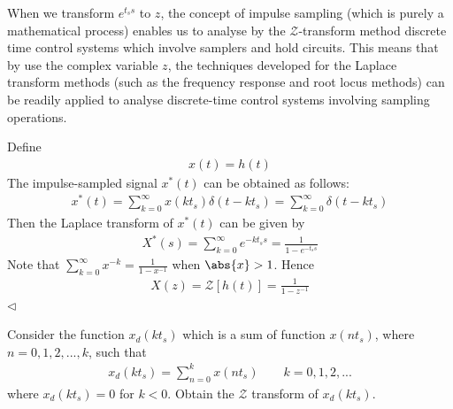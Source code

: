 \documentclass[12pt,a4paper,oneside]{book}
\begin{document}
\begin{onehalfspace}
When we transform $e^{t_ss}$ to $z$, the concept of impulse sampling (which is 
purely a mathematical process) enables us to analyse by the 
$\mathcal{Z}$-transform method discrete time control systems which involve 
samplers and hold 
circuits. This means that by use the complex variable $z$, the techniques 
developed for the Laplace transform methods (such as the frequency response and 
root locus methods) can be readily applied to analyse discrete-time control 
systems involving sampling operations.

\begin{example}
	
Define 
\begin{equation*}
	\begin{split}
		x(t) = h(t) 
	\end{split}
\end{equation*}
The impulse-sampled signal $x^*(t)$ can be obtained as follows:
\begin{equation*}
	\begin{split}
		x^*(t) = \sum_{k=0}^{\infty} x(kt_s)\delta(t-kt_s) = \sum_{k=0}^{\infty} \delta(t-kt_s)
	\end{split}
\end{equation*}
Then the Laplace transform of $x^*(t)$ can be given by
\begin{equation*}
	\begin{split}
		X^*(s) = \sum_{k=0}^{\infty} e^{-kt_ss} = \frac{1}{1-e^{-t_ss}}
	\end{split}
\end{equation*}
Note that $\sum_{k=0}^{\infty}x^{-k} = \frac{1}{1-x^{-1}}$ when $\abs{x}>1$.
Hence
\begin{equation*}
	\begin{split}
		X(z) = \mathcal{Z} \left[ h(t) \right] = \frac{1}{1-z^{-1}}
	\end{split}
\end{equation*}
$\triangleleft$
\end{example}

\begin{example}

Consider the function $x_d(kt_s)$ which is a sum of function $x(nt_s)$, where $n=0,1,2,...,k$, such that
\begin{equation*}
	\begin{split}
		x_d(kt_s) = \sum_{n=0}^{k}x(nt_s) \quad\quad k=0,1,2,...
	\end{split}
\end{equation*} 
where $x_d(kt_s)=0$ for $k<0$. Obtain the $\mathcal{Z}$ transform of $x_d(kt_s)$.


\end{example}
\end{onehalfspace}
\end{document}
